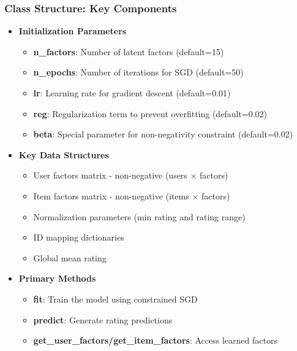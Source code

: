 \documentclass{beamer}
\begin{document}
\begin{frame}
\frametitle{Class Structure: Key Components}

\begin{itemize}
    \item \textbf{Initialization Parameters}
    \begin{itemize}
        \item \textbf{n\_factors}: Number of latent factors (default=15)
        \item \textbf{n\_epochs}: Number of iterations for SGD (default=50)
        \item \textbf{lr}: Learning rate for gradient descent (default=0.01)
        \item \textbf{reg}: Regularization term to prevent overfitting (default=0.02)
        \item \textbf{beta}: Special parameter for non-negativity constraint (default=0.02)
    \end{itemize}
    
    \item \textbf{Key Data Structures}
    \begin{itemize}
        \item User factors matrix - non-negative (users × factors)
        \item Item factors matrix - non-negative (items × factors)
        \item Normalization parameters (min rating and rating range)
        \item ID mapping dictionaries
        \item Global mean rating
    \end{itemize}
    
    \item \textbf{Primary Methods}
    \begin{itemize}
        \item \textbf{fit}: Train the model using constrained SGD
        \item \textbf{predict}: Generate rating predictions
        \item \textbf{get\_user\_factors/get\_item\_factors}: Access learned factors
    \end{itemize}
\end{itemize}
\end{frame}
\end{document}
